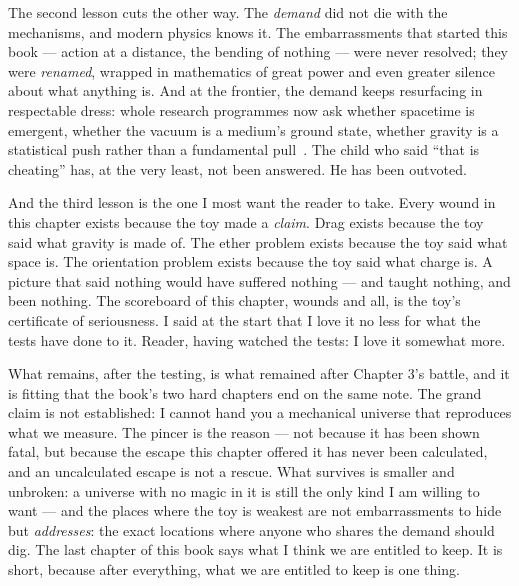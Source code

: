 \documentclass[fontsize=11pt,paper=a4,pagesize=auto,parskip=half-]{scrbook}
\newcommand\En{\centerline{\textemdash \qquad \ding{166} \qquad \textemdash}}
\begin{document}
The second lesson cuts the other way. The \emph{demand} did not die with the mechanisms, and modern physics knows it. The embarrassments that started this book --- action at a distance, the bending of nothing --- were never resolved; they were \emph{renamed}, wrapped in mathematics of great power and even greater silence about what anything is. And at the frontier, the demand keeps resurfacing in respectable dress: whole research programmes now ask whether spacetime is emergent, whether the vacuum is a medium's ground state, whether gravity is a statistical push rather than a fundamental pull~\cite{verlinde2011}. The child who said ``that is cheating'' has, at the very least, not been answered. He has been outvoted.

And the third lesson is the one I most want the reader to take. Every wound in this chapter exists because the toy made a \emph{claim}. Drag exists because the toy said what gravity is made of. The ether problem exists because the toy said what space is. The orientation problem exists because the toy said what charge is. A picture that said nothing would have suffered nothing --- and taught nothing, and been nothing. The scoreboard of this chapter, wounds and all, is the toy's certificate of seriousness. I said at the start that I love it no less for what the tests have done to it. Reader, having watched the tests: I love it somewhat more.

What remains, after the testing, is what remained after Chapter 3's battle, and it is fitting that the book's two hard chapters end on the same note. The grand claim is not established: I cannot hand you a mechanical universe that reproduces what we measure. The pincer is the reason --- not because it has been shown fatal, but because the escape this chapter offered it has never been calculated, and an uncalculated escape is not a rescue. What survives is smaller and unbroken: a universe with no magic in it is still the only kind I am willing to want --- and the places where the toy is weakest are not embarrassments to hide but \emph{addresses}: the exact locations where anyone who shares the demand should dig. The last chapter of this book says what I think we are entitled to keep. It is short, because after everything, what we are entitled to keep is one thing.

\En
\end{document}
